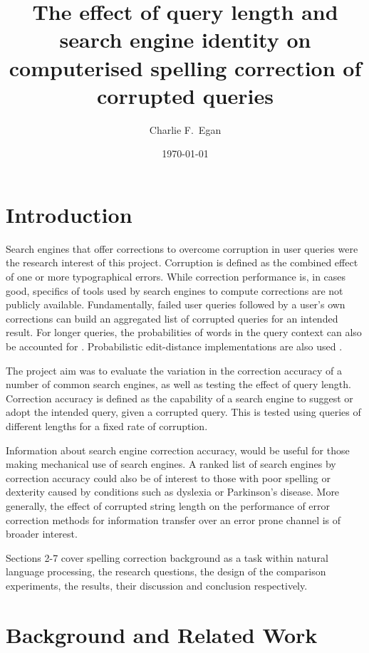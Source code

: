\documentclass{csfourzero}
\title{The effect of query length and search engine identity on computerised spelling correction of corrupted queries}
\author{Charlie F.\ Egan}
\date{\today}
\begin{document}
\maketitle

\section{Introduction}
\label{sec:intro}

Search engines that offer corrections to overcome corruption in user queries were the research interest of this project. Corruption is defined as the combined effect of one or more typographical errors. While correction performance is, in cases good, specifics of tools used by search engines to compute corrections are not publicly available. Fundamentally, failed user queries followed by a user's own corrections can build an aggregated list of corrupted queries for an intended result. For longer queries, the probabilities of words in the query context can also be accounted for \cite{noampatent}. Probabilistic edit-distance implementations are also used \cite{howtospellcorrector}.

The project aim was to evaluate the variation in the correction accuracy of a number of common search engines, as well as testing the effect of query length. Correction accuracy is defined as the capability of a search engine to suggest or adopt the intended query, given a corrupted query. This is tested using queries of different lengths for a fixed rate of corruption.

Information about search engine correction accuracy, would be useful for those making mechanical use of search engines. A ranked list of search engines by correction accuracy could also be of interest to those with poor spelling or dexterity caused by conditions such as dyslexia or Parkinson's disease. More generally, the effect of corrupted string length on the performance of error correction methods for information transfer over an error prone channel is of broader interest.

Sections 2-7 cover spelling correction background as a task within natural language processing, the research questions, the design of the comparison experiments, the results, their discussion and conclusion respectively.

\section{Background and Related Work}
\label{sec:lit}
\end{document}

